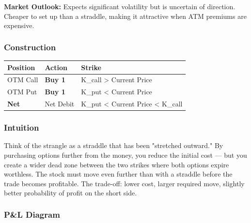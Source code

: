\documentclass[12pt,openany]{book}
\begin{document}
\textbf{Market Outlook:} Expects significant volatility but is uncertain of direction. Cheaper to set up than a straddle, making it attractive when ATM premiums are expensive.



\subsubsection{Construction}

\begin{center}
\scriptsize
\setlength{\tabcolsep}{3pt}
\begin{tabular}{|L{4.42cm}|L{4.42cm}|L{4.42cm}|}
\hline
Position & Action & Strike \\
\hline
OTM Call & \textbf{Buy 1} & K\_call > Current Price \\
\hline
OTM Put & \textbf{Buy 1} & K\_put < Current Price \\
\hline
\textbf{Net} & Net Debit & K\_put < Current Price < K\_call \\
\hline
\end{tabular}
\end{center}



\subsubsection{Intuition}

Think of the strangle as a straddle that has been "stretched outward." By purchasing options further from the money, you reduce the initial cost — but you create a wider dead zone between the two strikes where both options expire worthless. The stock must move even further than with a straddle before the trade becomes profitable. The trade-off: lower cost, larger required move, slightly better probability of profit on the short side.



\subsubsection{P\&L Diagram}
\end{document}
